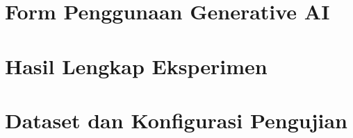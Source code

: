 \documentclass[11pt,a4paper]{article}
\begin{document}
\clearpage

\appendix
\section{Form Penggunaan Generative AI}
\par\pagebreak[0]

\section{Hasil Lengkap Eksperimen}
\par\pagebreak[0]

\section{Dataset dan Konfigurasi Pengujian}
\par\pagebreak[0]
\end{document}
